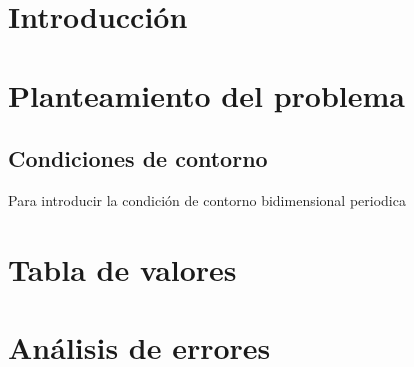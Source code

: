\documentclass[11pt, twoside]{article} %
\begin{document}
\pagestyle{main}

\section{Introducción}

\section{Planteamiento del problema}

\subsection{Condiciones de contorno}

Para introducir la condición de contorno bidimensional periodica

\newpage

\appendix

\section{Tabla de valores}


\newpage

\section{Análisis de errores}
\end{document}

